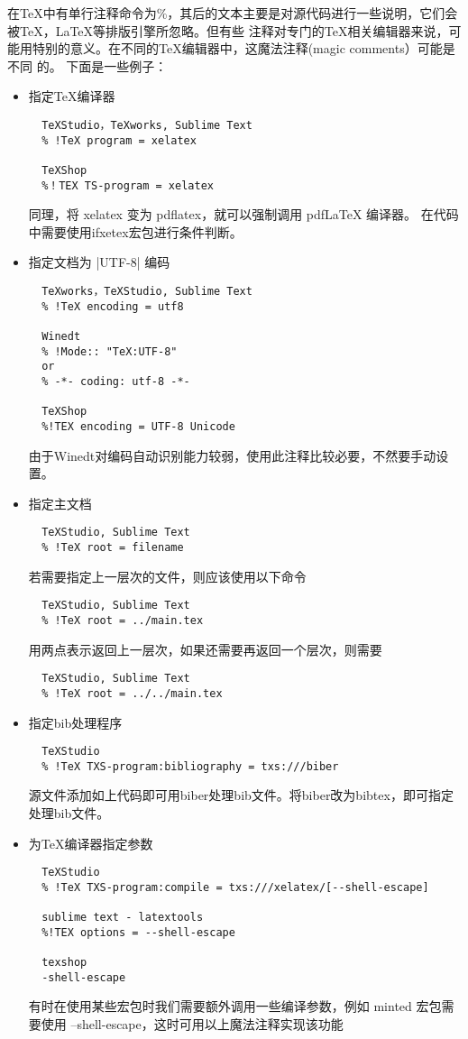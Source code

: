 在TeX中有单行注释命令为\%，其后的文本主要是对源代码进行一些说明，它们会被TeX，LaTeX等排版引擎所忽略。但有些
注释对专门的TeX相关编辑器来说，可能用特别的意义。在不同的TeX编辑器中，这魔法注释(magic comments）可能是不同
的。 下面是一些例子：
\begin{itemize}
  \item 指定\TeX{}编译器
  \begin{verbatim}
  TeXStudio，TeXworks, Sublime Text
  % !TeX program = xelatex
  
  TeXShop
  %！TEX TS-program = xelatex
  \end{verbatim}
  同理，将 xelatex 变为 pdflatex，就可以强制调用 pdfLaTeX 编译器。
  在代码中需要使用ifxetex宏包进行条件判断。 
  \item 指定文档为 |UTF-8| 编码
  \begin{verbatim}
  TeXworks，TeXStudio, Sublime Text
  % !TeX encoding = utf8
  
  Winedt
  % !Mode:: "TeX:UTF-8"
  or
  % -*- coding: utf-8 -*-
  
  TeXShop
  %!TEX encoding = UTF-8 Unicode
  \end{verbatim}
  由于Winedt对编码自动识别能力较弱，使用此注释比较必要，不然要手动设置。
  \item 指定主文档
  \begin{verbatim}
  TeXStudio, Sublime Text
  % !TeX root = filename
  \end{verbatim}
  若需要指定上一层次的文件，则应该使用以下命令
  \begin{verbatim}
  TeXStudio, Sublime Text
  % !TeX root = ../main.tex
  \end{verbatim}
  用两点表示返回上一层次，如果还需要再返回一个层次，则需要
  \begin{verbatim}
  TeXStudio, Sublime Text
  % !TeX root = ../../main.tex
  \end{verbatim}
  \item 指定bib处理程序
  \begin{verbatim}
  TeXStudio
  % !TeX TXS-program:bibliography = txs:///biber
  \end{verbatim}
  源文件添加如上代码即可用biber处理bib文件。将biber改为bibtex，即可指定\BibTeX{}处理bib文件。
  \item 
  为\TeX{}编译器指定参数
  \begin{verbatim}
  TeXStudio
  % !TeX TXS-program:compile = txs:///xelatex/[--shell-escape]
  
  sublime text - latextools
  %!TEX options = --shell-escape
  
  texshop
  -shell-escape
  \end{verbatim}
  有时在使用某些宏包时我们需要额外调用一些编译参数，例如 minted 宏包需要使用 --shell-escape，这时可用以上魔法注释实现该功能
\end{itemize}


